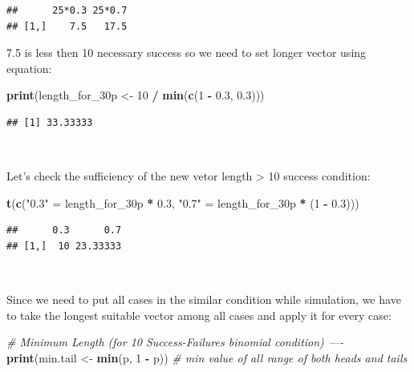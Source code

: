 \documentclass[]{article}
\newenvironment{Shaded}{\begin{snugshade}}{\end{snugshade}}
\newcommand{\CommentTok}[1]{\textcolor[rgb]{0.56,0.35,0.01}{\textit{#1}}}
\newcommand{\DecValTok}[1]{\textcolor[rgb]{0.00,0.00,0.81}{#1}}
\newcommand{\FloatTok}[1]{\textcolor[rgb]{0.00,0.00,0.81}{#1}}
\newcommand{\KeywordTok}[1]{\textcolor[rgb]{0.13,0.29,0.53}{\textbf{#1}}}
\newcommand{\NormalTok}[1]{#1}
\newcommand{\OperatorTok}[1]{\textcolor[rgb]{0.81,0.36,0.00}{\textbf{#1}}}
\newcommand{\StringTok}[1]{\textcolor[rgb]{0.31,0.60,0.02}{#1}}
\begin{document}
\begin{verbatim}
##      25*0.3 25*0.7
## [1,]    7.5   17.5
\end{verbatim}

7.5 is less then 10 necessary success so we need to set longer vector
using equation:

\begin{Shaded}
\begin{Highlighting}[]
\KeywordTok{print}\NormalTok{(length_for_30p <-}\StringTok{ }\DecValTok{10} \OperatorTok{/}\StringTok{ }\KeywordTok{min}\NormalTok{(}\KeywordTok{c}\NormalTok{(}\DecValTok{1} \OperatorTok{-}\StringTok{ }\FloatTok{0.3}\NormalTok{, }\FloatTok{0.3}\NormalTok{)))}
\end{Highlighting}
\end{Shaded}

\begin{verbatim}
## [1] 33.33333
\end{verbatim}

~

Let's check the sufficiency of the new vetor length \textgreater{} 10
success condition:

\begin{Shaded}
\begin{Highlighting}[]
\KeywordTok{t}\NormalTok{(}\KeywordTok{c}\NormalTok{(}\StringTok{"0.3"}\NormalTok{ =}\StringTok{ }\NormalTok{length_for_30p }\OperatorTok{*}\StringTok{ }\FloatTok{0.3}\NormalTok{, }\StringTok{"0.7"}\NormalTok{ =}\StringTok{ }\NormalTok{length_for_30p }\OperatorTok{*}\StringTok{ }\NormalTok{(}\DecValTok{1} \OperatorTok{-}\StringTok{ }\FloatTok{0.3}\NormalTok{)))}
\end{Highlighting}
\end{Shaded}

\begin{verbatim}
##      0.3      0.7
## [1,]  10 23.33333
\end{verbatim}

~

Since we need to put all cases in the similar condition while
simulation, we have to take the longest suitable vector among all cases
and apply it for every case:

\begin{Shaded}
\begin{Highlighting}[]
\CommentTok{# Minimum Length (for 10 Success-Failures binomial condition) ----}
\KeywordTok{print}\NormalTok{(min.tail <-}\StringTok{ }\KeywordTok{min}\NormalTok{(p, }\DecValTok{1} \OperatorTok{-}\StringTok{ }\NormalTok{p)) }\CommentTok{# min value of all range of both heads and tails}
\end{Highlighting}
\end{Shaded}
\end{document}
